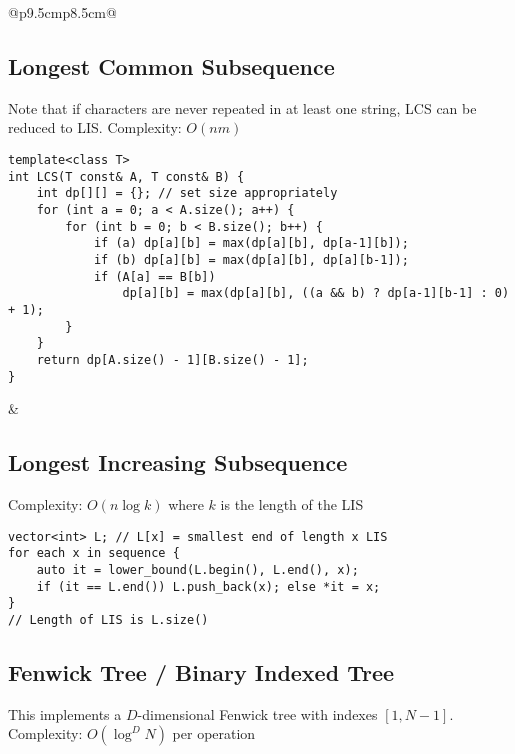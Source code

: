 \documentclass[letterpaper]{article}
\begin{document}
\begin{tabular}{@{}p{9.5cm}p{8.5cm}@{}}
    \subsection{Longest Common Subsequence}
    Note that if characters are never repeated in at least one string, LCS can be reduced to LIS. Complexity: $O\left(nm\right)$

    \begin{lstlisting}
template<class T>
int LCS(T const& A, T const& B) {
	int dp[][] = {}; // set size appropriately
	for (int a = 0; a < A.size(); a++) {
		for (int b = 0; b < B.size(); b++) {
			if (a) dp[a][b] = max(dp[a][b], dp[a-1][b]);
			if (b) dp[a][b] = max(dp[a][b], dp[a][b-1]);
			if (A[a] == B[b])
				dp[a][b] = max(dp[a][b], ((a && b) ? dp[a-1][b-1] : 0) + 1);
		}
	}
	return dp[A.size() - 1][B.size() - 1];
}
\end{lstlisting}
     &
    \subsection{Longest Increasing Subsequence}
    Complexity: $O\left(n\log k\right)$ where $k$ is the length of the LIS

    \begin{lstlisting}
vector<int> L; // L[x] = smallest end of length x LIS
for each x in sequence {
	auto it = lower_bound(L.begin(), L.end(), x);
	if (it == L.end()) L.push_back(x); else *it = x;
}
// Length of LIS is L.size()
\end{lstlisting}
\end{tabular}

\clearpage

\subsection{Fenwick Tree / Binary Indexed Tree}

This implements a $D$-dimensional Fenwick tree with indexes $\left[1,N-1\right]$. Complexity: $O\left(\log^DN\right)$ per operation
\end{document}
